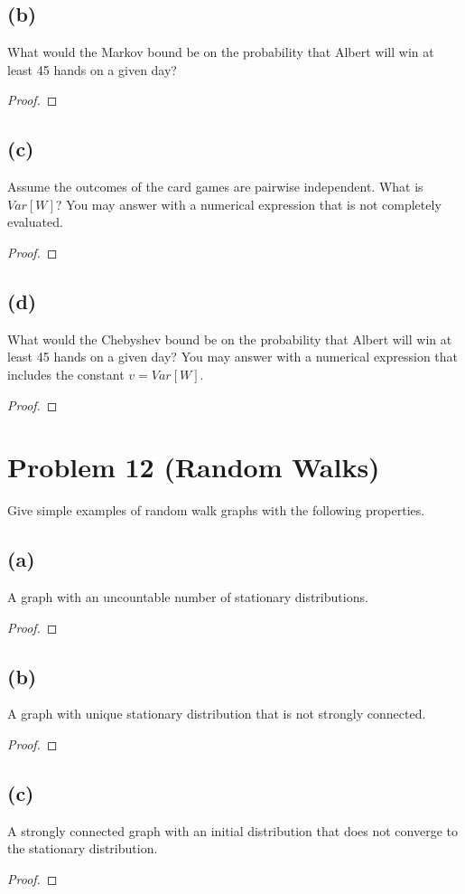 \documentclass[14pt]{extarticle}
\begin{document}
\subsection{(b)}
What would the Markov bound be on the probability that Albert will win at least 45 hands on a given day?
\begin{proof}
\end{proof}

\subsection{(c)}
Assume the outcomes of the card games are pairwise independent. What is $Var[W ]$? You may answer with a numerical expression that is not completely evaluated.
\begin{proof}
\end{proof}

\subsection{(d)}
What would the Chebyshev bound be on the probability that Albert will win at least 45 hands on a given day? You may answer with a numerical expression that includes the constant $v = Var[W ]$.
\begin{proof}
\end{proof}

\section{Problem 12 (Random Walks)}
Give simple examples of random walk graphs with the following properties.
\subsection{(a)}
A graph with an uncountable number of stationary distributions.
\begin{proof}
\end{proof}

\subsection{(b)}
A graph with unique stationary distribution that is not strongly connected.
\begin{proof}
\end{proof}

\subsection{(c)}
A strongly connected graph with an initial distribution that does not converge to the stationary distribu­tion.
\begin{proof}
\end{proof}
\end{document}
